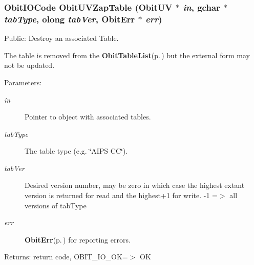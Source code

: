 \subsubsection{\setlength{\rightskip}{0pt plus 5cm}Obit\-IOCode Obit\-UVZap\-Table ({\bf Obit\-UV} $\ast$ {\em in}, gchar $\ast$ {\em tab\-Type}, {\bf olong} {\em tab\-Ver}, {\bf Obit\-Err} $\ast$ {\em err})}\label{ObitUV_8c_a31}


Public: Destroy an associated Table. 

The table is removed from the {\bf Obit\-Table\-List}{\rm (p.\,\pageref{structObitTableList})} but the external form may not be updated. \begin{Desc}
\item[Parameters:]
\begin{description}
\item[{\em in}]Pointer to object with associated tables. \item[{\em tab\-Type}]The table type (e.g. \char`\"{}AIPS CC\char`\"{}). \item[{\em tab\-Ver}]Desired version number, may be zero in which case the highest extant version is returned for read and the highest+1 for write. -1 =$>$ all versions of tab\-Type \item[{\em err}]{\bf Obit\-Err}{\rm (p.\,\pageref{structObitErr})} for reporting errors. \end{description}
\end{Desc}
\begin{Desc}
\item[Returns:]return code, OBIT\_\-IO\_\-OK=$>$ OK \end{Desc}

